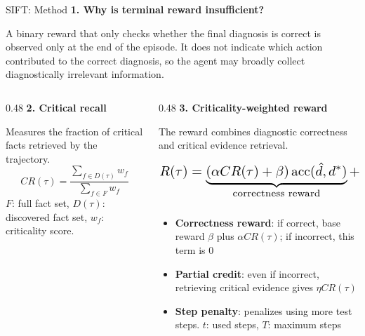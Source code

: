 \documentclass[
11pt,notheorems,hyperref={pdfauthor=whatever}
]{beamer}
\begin{document}
\begin{frame}{SIFT: Method}
\vspace{0.35em}
{\large\bfseries\textcolor{primary}{1. Why is terminal reward insufficient?}}

\vspace{0.35em}
{\small
A binary reward that only checks whether the final diagnosis is correct is observed only at the end of the episode. It does not indicate which action contributed to the correct diagnosis, so the agent may broadly collect diagnostically irrelevant information.
}

\vspace{1.0em}
\begin{columns}[T,onlytextwidth]
\begin{column}{0.48\textwidth}
{\large\bfseries\textcolor{primary}{2. Critical recall}}

\vspace{0.35em}
{\small
Measures the fraction of critical facts retrieved by the trajectory.
}
\[
CR(\tau)=
\frac{\sum_{f \in D(\tau)} w_f}
{\sum_{f \in F} w_f}
\]
\vspace{-0.25em}
{\footnotesize \(F\): full fact set, \(D(\tau)\): discovered fact set, \(w_f\): criticality score.}
\end{column}
\begin{column}{0.48\textwidth}
{\large\bfseries\textcolor{primary}{3. Criticality-weighted reward}}

\vspace{0.35em}
{\small
The reward combines diagnostic correctness and critical evidence retrieval.
}
\[
\resizebox{\linewidth}{!}{$
R(\tau)=
\underbrace{(\alpha CR(\tau)+\beta)\,\mathrm{acc}(\hat d,d^{*})}_{\text{\scriptsize correctness reward}}
+
\underbrace{\eta CR(\tau)}_{\text{\scriptsize partial credit}}
-
\underbrace{\lambda\frac{t}{T}}_{\text{\scriptsize step penalty}}
$}
\]
\vspace{-0.45em}
{\footnotesize
\begin{itemize}
  \item \textbf{Correctness reward}: if correct, base reward \(\beta\) plus \(\alpha CR(\tau)\); if incorrect, this term is \(0\)
  \item \textbf{Partial credit}: even if incorrect, retrieving critical evidence gives \(\eta CR(\tau)\)
  \item \textbf{Step penalty}: penalizes using more test steps. \(t\): used steps, \(T\): maximum steps
\end{itemize}
}
\end{column}
\end{columns}
\end{frame}
\end{document}
